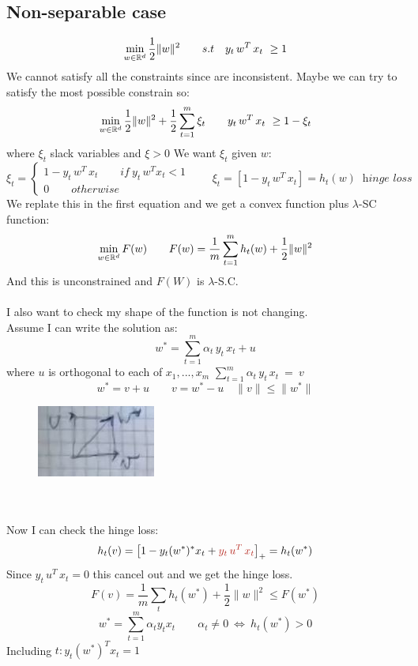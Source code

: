 \documentclass[../main.tex]{subfiles}
\begin{document}
\subsection{Non-separable case}
$$
\min_{w \in \mathbb{R}^d} \frac{1}{2}
 \| w\|^2 \qquad s.t \quad y_t\, w^T \, x_t \ \geq 1$$
We cannot satisfy all the constraints since are inconsistent. Maybe we can try to satisfy the most possible constrain so:
$$
\min_{w \in \mathbb{R}^d} \frac{1}{2}
 \| w\|^2  + \frac{1}{2} \sum_{t=1}^m \xi_t \qquad
 y_t\, w^T \, x_t \ \geq 1- \xi_t
$$
where $\xi_t$ slack variables and $ \xi > 0$
We want $\xi_t$ given $w$:
$$
\xi_t =  \begin{cases}
1- y_t \, w^T \, x_t \qquad if \ y_t \, w^T x_t < 1
\\
0 \qquad otherwise
\end{cases} \qquad \xi_t = \left[ 1- y_t \, w^T \, x_t \right] = h_t(w) \ \textit{ hinge loss}
$$
We replate this in the first equation and we get a convex function plus $\lambda$-SC function:
$$
\min_{w \in \mathbb{R}^d} F(w) \qquad F(w) = \frac{1}{m} \sum_{t = 1}^m h_t(w) + \frac{1}{2}
\| w\|^2 $$
And this is unconstrained and $F(W)$ is $\lambda$-S.C.
\\\\
I also want to check my shape of the function is not changing. 
\\ 
Assume I can write the solution as:
$$
w^* = \sum_{t=1}^m \alpha_t \, y_t \, x_t + u 
$$
where $u$ is orthogonal to each of $x_1,...,x_m$
$
 \sum_{t=1}^m \alpha_t \, y_t \, x_t \ = \ v
 $
$$
 w^* = v + u \qquad v = w^* - u \quad \|v \| \leq \| w^*\|
$$
\begin{figure}[h]
    \centering
    \includegraphics[width=0.3\linewidth]{../img/lez20-img1.JPG}
    \caption{}
\end{figure}\\
\\
Now I can check the hinge loss:
$$
h_t(v) = \left[ 1- y_t(w^*)^* x_t+  \red{y_t \, u^T \, x_t} \right]_+ = h_t(w^*)
$$
Since $y_t \, u^T \, x_t = 0$ this cancel out and we get the hinge loss.
$$
F(v) = \frac{1}{m} \sum_t h_t(w^*) + \frac{1}{2} \| w\|^2 \leq F(w^*)
$$
$$
w^* = \sum_{t=1}^m \alpha_t y_t x_t \qquad \alpha_t \neq 0 \ \Leftrightarrow \ h_t(w^*) > 0
$$
Including $t : y_t(w^*)^T x_t = 1$\\
\end{document}
